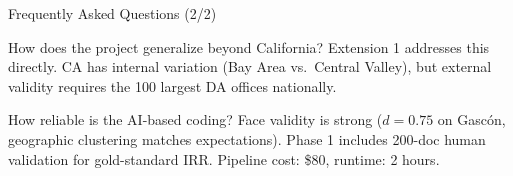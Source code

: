 \documentclass[aspectratio=169, 11pt]{beamer}
\begin{document}
\begin{frame}{Frequently Asked Questions (2/2)}
\begin{block}{How does the project generalize beyond California?}
{\small Extension 1 addresses this directly. CA has internal variation (Bay Area vs.\ Central Valley), but external validity requires the 100 largest DA offices nationally.}
\end{block}
\vspace{6pt}
\begin{block}{How reliable is the AI-based coding?}
{\small Face validity is strong ($d = 0.75$ on Gasc\'on, geographic clustering matches expectations). Phase 1 includes 200-doc human validation for gold-standard IRR. Pipeline cost: \$80, runtime: 2 hours.}
\end{block}
\end{frame}
\end{document}
